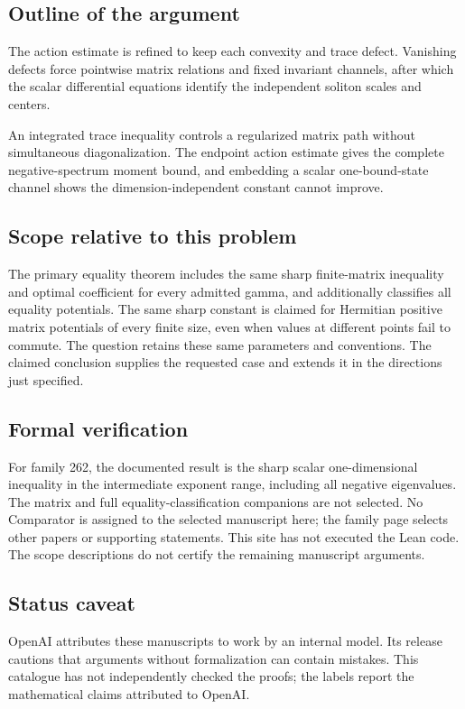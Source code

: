 \documentclass[11pt]{article}
\begin{document}
\subsection{Outline of the argument}
The action estimate is refined to keep each convexity and trace defect. Vanishing defects force pointwise matrix relations and fixed invariant channels, after which the scalar differential equations identify the independent soliton scales and centers.

An integrated trace inequality controls a regularized matrix path without simultaneous diagonalization. The endpoint action estimate gives the complete negative-spectrum moment bound, and embedding a scalar one-bound-state channel shows the dimension-independent constant cannot improve.

\subsection{Scope relative to this problem}
The primary equality theorem includes the same sharp finite-matrix inequality and optimal coefficient for every admitted gamma, and additionally classifies all equality potentials. The same sharp constant is claimed for Hermitian positive matrix potentials of every finite size, even when values at different points fail to commute. The question retains these same parameters and conventions. The claimed conclusion supplies the requested case and extends it in the directions just specified.

\subsection{Formal verification}
For family 262, the documented result is the sharp scalar one-dimensional inequality in the intermediate exponent range, including all negative eigenvalues. The matrix and full equality-classification companions are not selected. No Comparator is assigned to the selected manuscript here; the family page selects other papers or supporting statements. This site has not executed the Lean code. The scope descriptions do not certify the remaining manuscript arguments.

\subsection{Status caveat}
OpenAI attributes these manuscripts to work by an internal model. Its release cautions that arguments without formalization can contain mistakes. This catalogue has not independently checked the proofs; the labels report the mathematical claims attributed to OpenAI.
\end{document}

